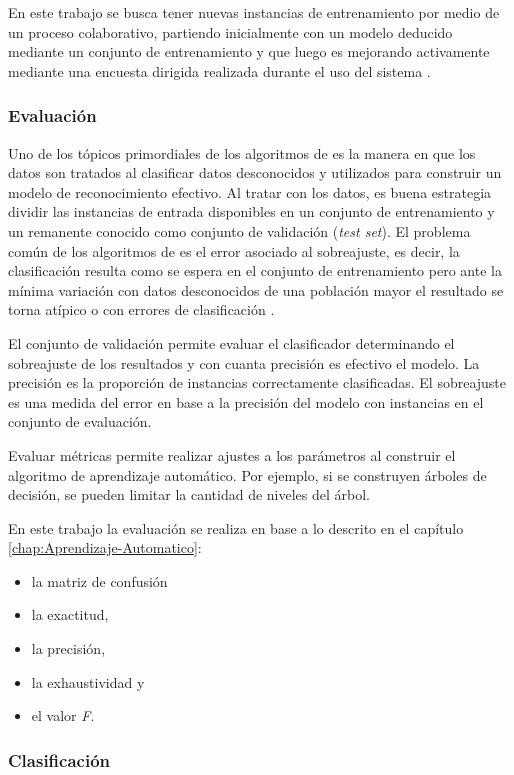 En este trabajo se busca tener nuevas instancias de entrenamiento
por medio de un proceso colaborativo, partiendo inicialmente con un
modelo deducido mediante un conjunto de entrenamiento y que luego
es mejorando activamente mediante una encuesta dirigida realizada
durante el uso del sistema .

\subsubsection{Evaluación}

Uno de los tópicos primordiales de los algoritmos de  es
la manera en que los datos son tratados al clasificar datos desconocidos
y utilizados para construir un modelo de reconocimiento efectivo.
Al tratar con los datos, es buena estrategia dividir las instancias
de entrada disponibles en un conjunto de entrenamiento y un remanente
conocido como conjunto de validación (\emph{test set}). El problema
común de los algoritmos de  es el error asociado al sobreajuste,
es decir, la clasificación resulta como se espera en el conjunto de
entrenamiento pero ante la mínima variación con datos desconocidos
de una población mayor el resultado se torna atípico o con errores
de clasificación \cite{Rajaraman2011}. 

El conjunto de validación permite evaluar el clasificador determinando
el sobreajuste de los resultados y con cuanta precisión es efectivo
el modelo. La precisión es la proporción de instancias correctamente
clasificadas. El sobreajuste es una medida del error en base a la
precisión del modelo con instancias en el conjunto de evaluación.

Evaluar métricas permite realizar ajustes a los parámetros al construir
el algoritmo de aprendizaje automático. Por ejemplo, si se construyen
árboles de decisión, se pueden limitar la cantidad de niveles del
árbol.

En este trabajo la evaluación se realiza en base a lo descrito en
el capítulo \ref{chap:Aprendizaje-Automatico}:
\begin{itemize}
\item la matriz de confusión 
\item la exactitud, 
\item la precisión, 
\item la exhaustividad y 
\item el valor \emph{F}.
\end{itemize}

\subsubsection{Clasificación}


